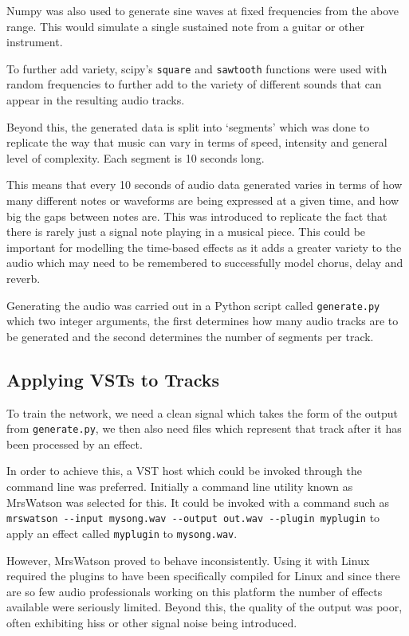 \documentclass{l4proj}
\begin{document}
Numpy was also used to generate sine waves at fixed frequencies from the
above range. This would simulate a single sustained note from a guitar
or other instrument.

To further add variety, scipy's \texttt{square} and \texttt{sawtooth}
functions were used with random frequencies to further add to the
variety of different sounds that can appear in the resulting audio
tracks.

Beyond this, the generated data is split into `segments' which was done
to replicate the way that music can vary in terms of speed, intensity
and general level of complexity. Each segment is 10 seconds long.

This means that every 10 seconds of audio data generated varies in terms
of how many different notes or waveforms are being expressed at a given
time, and how big the gaps between notes are. This was introduced to
replicate the fact that there is rarely just a signal note playing in a
musical piece. This could be important for modelling the time-based
effects as it adds a greater variety to the audio which may need to be
remembered to successfully model chorus, delay and reverb.

Generating the audio was carried out in a Python script called
\texttt{generate.py} which two integer arguments, the first determines
how many audio tracks are to be generated and the second determines the
number of segments per track.

\hypertarget{applying-vsts-to-tracks}{%
\subsection{Applying VSTs to Tracks}\label{applying-vsts-to-tracks}}

To train the network, we need a clean signal which takes the form of the
output from \texttt{generate.py}, we then also need files which
represent that track after it has been processed by an effect.

In order to achieve this, a VST host which could be invoked through the
command line was preferred. Initially a command line utility known as
MrsWatson was selected for this. It could be invoked with a command such
as
\texttt{mrswatson\ -\/-input\ mysong.wav\ -\/-output\ out.wav\ -\/-plugin\ myplugin}
to apply an effect called \texttt{myplugin} to \texttt{mysong.wav}.

However, MrsWatson proved to behave inconsistently. Using it with Linux
required the plugins to have been specifically compiled for Linux and
since there are so few audio professionals working on this platform the
number of effects available were seriously limited. Beyond this, the
quality of the output was poor, often exhibiting hiss or other signal
noise being introduced.
\end{document}
